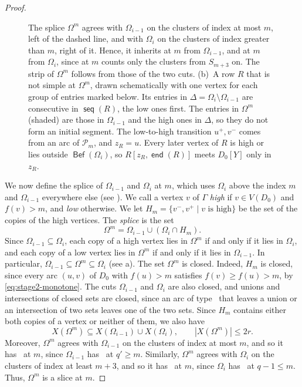 \documentclass[fontsize=12pt,leading=14pt]{fullpaper}
\DeclareMathOperator{\en}{\mathsf{end}}
\DeclareMathOperator{\Bef}{\mathsf{Bef}}
\DeclareMathOperator{\seq}{\mathsf{seq}}
\newcommand{\Pcal}{\mathcal{P}}
\begin{document}
\begin{proof}
\begin{figure}[!ht]
{      The splice $\Omega^m$ agrees with $\Omega_{i-1}$ on the clusters of index at most $m$, left of the dashed line, and with $\Omega_i$ on the clusters of index greater than $m$, right of it.
      Hence, it inherits  at $m$ from $\Omega_{i-1}$, and  at $m$ from $\Omega_i$, since  at $m$ counts only the clusters from $S_{m+3}$ on.
      The strip of $\Omega^m$ follows from those of the two cuts.
      (b)~A row $R$ that is not simple at $\Omega^m$, drawn schematically with one vertex for each group of entries marked below.
      Its entries in $\Delta=\Omega_i\setminus\Omega_{i-1}$ are consecutive in $\seq(R)$, the low ones first.
      The entries in $\Omega^m$ (shaded) are those in $\Omega_{i-1}$ and the high ones in $\Delta$, so they do not form an initial segment.
      The low-to-high transition $u^+,v^-$ comes from an arc of $\Pcal_m$, and $z_R=u$.
    Every later vertex of $R$ is high or lies outside $\Bef(\Omega_i)$, so $R[z_R,\en(R)]$ meets $D_0[Y]$ only in $z_R$.}
    \label{fig:stage2-splice}
  \end{figure}

  We now define the splice of $\Omega_{i-1}$ and $\Omega_i$ at $m$, which uses $\Omega_i$ above the index $m$ and $\Omega_{i-1}$ everywhere else (see ).
  We call a vertex $v$ of $\Gamma$ \emph{high} if $v\in V(D_0)$ and $f(v)>m$, and \emph{low} otherwise.
  We let $H_m=\{v^-,v^+\mid v\text{ is high}\}$ be the set of the copies of the high vertices.
  The \emph{splice} is the set
  \[
    \Omega^m=\Omega_{i-1}\cup(\Omega_i\cap H_m).
  \]
  Since $\Omega_{i-1}\subseteq\Omega_i$, each copy of a high vertex lies in $\Omega^m$ if and only if it lies in $\Omega_i$, and each copy of a low vertex lies in $\Omega^m$ if and only if it lies in $\Omega_{i-1}$.
  In particular, $\Omega_{i-1}\subseteq\Omega^m\subseteq\Omega_i$ (see a).
  The set $\Omega^m$ is closed.
  Indeed, $H_m$ is closed, since every arc $(u,v)$ of $D_0$ with $f(u)>m$ satisfies $f(v)\ge f(u)>m$, by \eqref{eq:stage2-monotone}.
  The cuts $\Omega_{i-1}$ and $\Omega_i$ are also closed, and unions and intersections of closed sets are closed, since an arc of type~ that leaves a union or an intersection of two sets leaves one of the two sets.
  Since $H_m$ contains either both copies of a vertex or neither of them, we also have
  \[
    X(\Omega^m)\subseteq X(\Omega_{i-1})\cup X(\Omega_i),\qquad |X(\Omega^m)|\le2r.
  \]
  Moreover, $\Omega^m$ agrees with $\Omega_{i-1}$ on the clusters of index at most $m$, and so it has~ at $m$, since $\Omega_{i-1}$ has~ at $q'\ge m$.
  Similarly, $\Omega^m$ agrees with $\Omega_i$ on the clusters of index at least $m+3$, and so it has~ at $m$, since $\Omega_i$ has~ at $q-1\le m$.
  Thus, $\Omega^m$ is a slice at $m$.


\end{proof}
\end{document}
